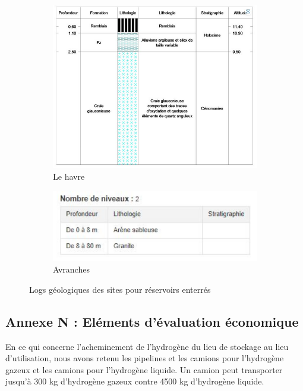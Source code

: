 \documentclass[11pt,french,a4paper]{article}
\begin{document}
\begin{figure}
     \centering
     \begin{subfigure}[b]{0.48\textwidth}
         \centering
         \includegraphics[width=\textwidth]{image/annexe/chap4/le_havre.png}
         \caption{Le havre}
     \end{subfigure}
     \begin{subfigure}[b]{0.48\textwidth}
         \centering
         \includegraphics[width=\textwidth]{image/annexe/chap4/avranches.png}
         \caption{Avranches}
     \end{subfigure}
        \caption{Logs géologiques des sites pour réservoirs enterrés}
\end{figure}
\FloatBarrier
\subsection*{Annexe N : Eléments d'évaluation économique}

En ce qui concerne l’acheminement de l’hydrogène du lieu de stockage au lieu d’utilisation, nous avons retenu les pipelines et les camions pour l’hydrogène gazeux et les camions pour l’hydrogène liquide.
Un camion peut transporter jusqu’à 300 kg d’hydrogène gazeux contre 4500 kg d’hydrogène liquide.
\end{document}
